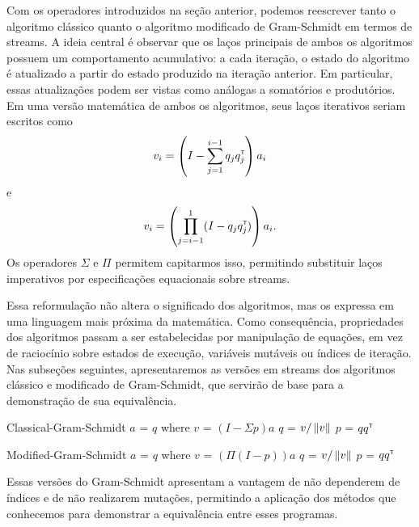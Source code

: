 
Com os operadores introduzidos na seção anterior, podemos reescrever tanto o algoritmo clássico quanto o algoritmo modificado de Gram-Schmidt em termos de streams. A ideia central é observar que os laços principais de ambos os algoritmos possuem um comportamento acumulativo: a cada iteração, o estado do algoritmo é atualizado a partir do estado produzido na iteração anterior. Em particular, essas atualizações podem ser vistas como análogas a somatórios e produtórios. Em uma versão matemática de ambos os algoritmos, seus laços iterativos seriam escritos como
\[
  v_i = \left(I - \sum_{j=1}^{i-1} q_j q_j^{\scriptscriptstyle\mathsf{T}\mkern-1mu} \right) a_i
\]
e
\[
  v_i = \left(\prod_{j=i-1}^{1} (I - q_j q_j^{\scriptscriptstyle\mathsf{T}\mkern-1mu})\right) a_i.
\]
Os operadores $\Sigma$ e $\Pi$ permitem capitarmos isso, permitindo substituir laços imperativos por especificações equacionais sobre streams.

Essa reformulação não altera o significado dos algoritmos, mas os expressa em uma linguagem mais próxima da matemática. Como consequência, propriedades dos algoritmos passam a ser estabelecidas por manipulação de equações, em vez de raciocínio sobre estados de execução, variáveis mutáveis ou índices de iteração. Nas subseções seguintes, apresentaremos as versões em streams dos algoritmos clássico e modificado de Gram-Schmidt, que servirão de base para a demonstração de sua equivalência.

\begin{code}
Classical-Gram-Schmidt $a$ = $q$
    where
        $v$ = $(I - \Sigma p) a$
        $q$ = $v / \left\lVert v\right\rVert$
        $p$ = $qq^{\scriptscriptstyle\mathsf{T}\mkern-1mu}$

Modified-Gram-Schmidt $a$ = $q$
    where
        $v$ = $(\Pi(I - p)) a$
        $q$ = $v / \left\lVert v\right\rVert$
        $p$ = $qq^{\scriptscriptstyle\mathsf{T}\mkern-1mu}$
\end{code}

Essas versões do Gram-Schmidt apresentam a vantagem de não dependerem de índices e de não realizarem mutações, permitindo a aplicação dos métodos que conhecemos para demonstrar a equivalência entre esses programas.

